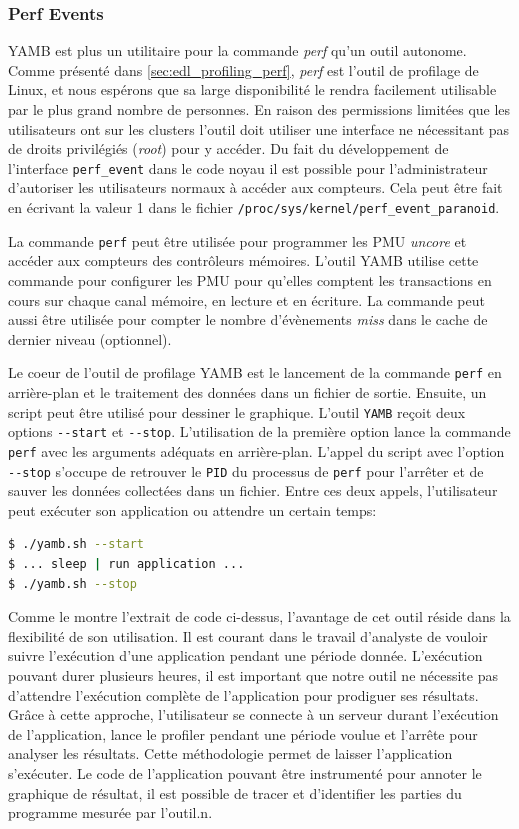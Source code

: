     \subsubsection{Perf Events}
     
        YAMB est plus un utilitaire pour la commande \textit{perf} qu'un outil autonome. Comme présenté dans \autoref{sec:edl_profiling_perf}, \textit{perf} est l'outil de profilage de Linux, et nous espérons que sa large disponibilité le rendra facilement utilisable par le plus grand nombre de personnes.  En raison des permissions limitées que les utilisateurs ont sur les clusters l'outil doit utiliser une interface ne nécessitant pas de droits privilégiés (\textit{root}) pour y accéder. Du fait du développement de l'interface \verb=perf_event= dans le code noyau il est possible pour l'administrateur d'autoriser les utilisateurs normaux à accéder aux compteurs. Cela peut être fait en écrivant la valeur 1 dans le fichier \verb=/proc/sys/kernel/perf_event_paranoid=.
        
        La commande \verb=perf= peut être utilisée pour programmer les PMU \textit{uncore} et accéder aux compteurs des contrôleurs mémoires. L'outil YAMB utilise cette commande pour configurer les PMU pour qu'elles comptent les transactions en cours sur chaque canal mémoire, en lecture et en écriture. La commande peut aussi être utilisée pour compter le nombre d'évènements \textit{miss} dans le cache de dernier niveau (optionnel).
        
        Le coeur de l'outil de profilage YAMB est le lancement de la commande \verb=perf= en arrière-plan et le traitement des données dans un fichier de sortie. Ensuite, un script peut être utilisé pour dessiner le graphique. 
        L'outil \verb=YAMB= reçoit deux options \verb=--start= et \verb=--stop=. L'utilisation de la première option lance la commande \verb|perf| avec les arguments adéquats en arrière-plan. L'appel du script avec l'option \verb=--stop= s'occupe de retrouver le \verb|PID| du processus de \verb|perf| pour l'arrêter et de sauver les données collectées dans un fichier. Entre ces deux appels, l'utilisateur peut exécuter son application ou attendre un certain temps:
\begin{lstlisting}[language=bash]
$ ./yamb.sh --start
$ ... sleep | run application ...
$ ./yamb.sh --stop
\end{lstlisting}
        Comme le montre l'extrait de code ci-dessus, l'avantage de cet outil réside dans la flexibilité de son utilisation. Il est courant dans le travail d'analyste de vouloir suivre l'exécution d'une application pendant une période donnée. L'exécution pouvant durer plusieurs heures, il est important que notre outil ne nécessite pas d'attendre l'exécution complète de l'application pour prodiguer ses résultats. Grâce à cette approche, l'utilisateur se connecte à un serveur durant l'exécution de l'application, lance le profiler pendant une période voulue et l'arrête pour analyser les résultats. Cette méthodologie permet de laisser l'application s'exécuter. Le code de l'application pouvant être instrumenté pour annoter le graphique de résultat, il est possible de tracer et d'identifier les parties du programme mesurée par l'outil.n.
        

